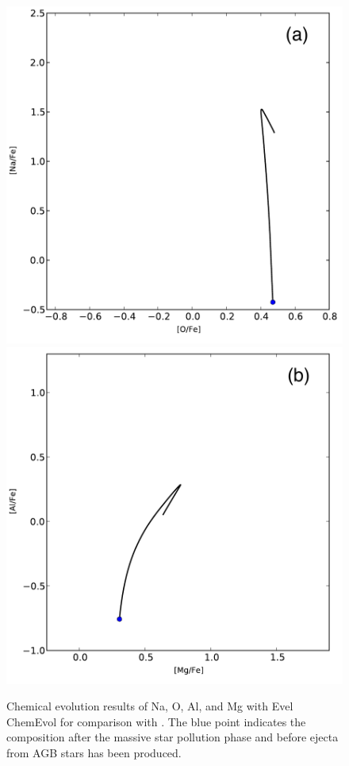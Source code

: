 \begin{figure}
 \begin{center}\includegraphics[width=0.7\columnwidth]{f8a.pdf}\\
\includegraphics[width=0.7\columnwidth]{f8b.pdf}
 \end{center}
 \caption{Chemical evolution results of Na, O, Al, and Mg with Evel ChemEvol for comparison with \citet[][Figure 1]{Fenner:2004ju}. The blue point indicates the composition after the massive star pollution phase and before ejecta from AGB stars has been produced.}
 \label{fig:fennertestnaomg}
\end{figure}

